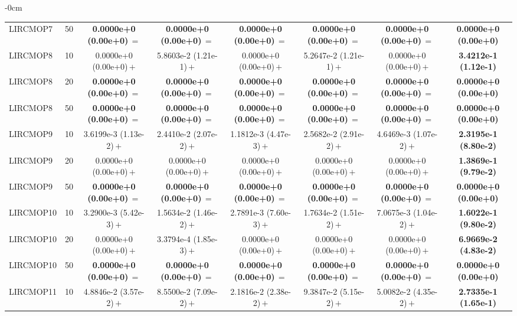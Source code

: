 \begin{table}[!htbp]
\begin{ROneBlock}
\begin{adjustwidth}{-\extralength}{0cm}
\begin{tabular*}{\linewidth}{@{\extracolsep{\fill}}llcccccc@{}}
LIRCMOP7 & 50 & \textbf{0.0000e+0 (0.00e+0)}\,$=$ & \textbf{0.0000e+0 (0.00e+0)}\,$=$ & \textbf{0.0000e+0 (0.00e+0)}\,$=$ & \textbf{0.0000e+0 (0.00e+0)}\,$=$ & \textbf{0.0000e+0 (0.00e+0)}\,$=$ & \textbf{0.0000e+0 (0.00e+0)} \\
LIRCMOP8 & 10 & 0.0000e+0 (0.00e+0)\,$+$ & 5.8603e-2 (1.21e-1)\,$+$ & 0.0000e+0 (0.00e+0)\,$+$ & 5.2647e-2 (1.21e-1)\,$+$ & 0.0000e+0 (0.00e+0)\,$+$ & \textbf{3.4212e-1 (1.12e-1)} \\
LIRCMOP8 & 20 & \textbf{0.0000e+0 (0.00e+0)}\,$=$ & \textbf{0.0000e+0 (0.00e+0)}\,$=$ & \textbf{0.0000e+0 (0.00e+0)}\,$=$ & \textbf{0.0000e+0 (0.00e+0)}\,$=$ & \textbf{0.0000e+0 (0.00e+0)}\,$=$ & \textbf{0.0000e+0 (0.00e+0)} \\
LIRCMOP8 & 50 & \textbf{0.0000e+0 (0.00e+0)}\,$=$ & \textbf{0.0000e+0 (0.00e+0)}\,$=$ & \textbf{0.0000e+0 (0.00e+0)}\,$=$ & \textbf{0.0000e+0 (0.00e+0)}\,$=$ & \textbf{0.0000e+0 (0.00e+0)}\,$=$ & \textbf{0.0000e+0 (0.00e+0)} \\
LIRCMOP9 & 10 & 3.6199e-3 (1.13e-2)\,$+$ & 2.4410e-2 (2.07e-2)\,$+$ & 1.1812e-3 (4.47e-3)\,$+$ & 2.5682e-2 (2.91e-2)\,$+$ & 4.6469e-3 (1.07e-2)\,$+$ & \textbf{2.3195e-1 (8.80e-2)} \\
LIRCMOP9 & 20 & 0.0000e+0 (0.00e+0)\,$+$ & 0.0000e+0 (0.00e+0)\,$+$ & 0.0000e+0 (0.00e+0)\,$+$ & 0.0000e+0 (0.00e+0)\,$+$ & 0.0000e+0 (0.00e+0)\,$+$ & \textbf{1.3869e-1 (9.79e-2)} \\
LIRCMOP9 & 50 & \textbf{0.0000e+0 (0.00e+0)}\,$=$ & \textbf{0.0000e+0 (0.00e+0)}\,$=$ & \textbf{0.0000e+0 (0.00e+0)}\,$=$ & \textbf{0.0000e+0 (0.00e+0)}\,$=$ & \textbf{0.0000e+0 (0.00e+0)}\,$=$ & \textbf{0.0000e+0 (0.00e+0)} \\
LIRCMOP10 & 10 & 3.2900e-3 (5.42e-3)\,$+$ & 1.5634e-2 (1.46e-2)\,$+$ & 2.7891e-3 (7.60e-3)\,$+$ & 1.7634e-2 (1.51e-2)\,$+$ & 7.0675e-3 (1.04e-2)\,$+$ & \textbf{1.6022e-1 (9.80e-2)} \\
LIRCMOP10 & 20 & 0.0000e+0 (0.00e+0)\,$+$ & 3.3794e-4 (1.85e-3)\,$+$ & 0.0000e+0 (0.00e+0)\,$+$ & 0.0000e+0 (0.00e+0)\,$+$ & 0.0000e+0 (0.00e+0)\,$+$ & \textbf{6.9669e-2 (4.83e-2)} \\
LIRCMOP10 & 50 & \textbf{0.0000e+0 (0.00e+0)}\,$=$ & \textbf{0.0000e+0 (0.00e+0)}\,$=$ & \textbf{0.0000e+0 (0.00e+0)}\,$=$ & \textbf{0.0000e+0 (0.00e+0)}\,$=$ & \textbf{0.0000e+0 (0.00e+0)}\,$=$ & \textbf{0.0000e+0 (0.00e+0)} \\
LIRCMOP11 & 10 & 4.8846e-2 (3.57e-2)\,$+$ & 8.5500e-2 (7.09e-2)\,$+$ & 2.1816e-2 (2.38e-2)\,$+$ & 9.3847e-2 (5.15e-2)\,$+$ & 5.0082e-2 (4.35e-2)\,$+$ & \textbf{2.7335e-1 (1.65e-1)} \\

\end{tabular*}
\end{adjustwidth}
\end{ROneBlock}
\end{table}
